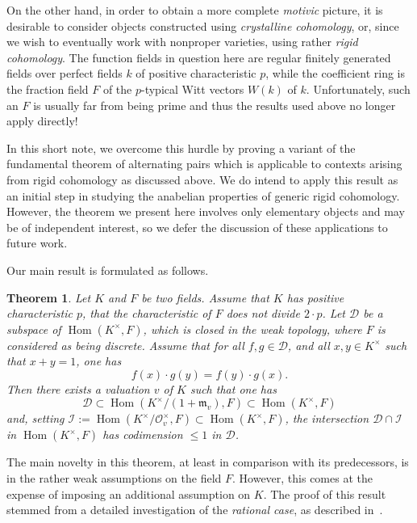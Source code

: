 \documentclass[12pt]{amsart}
\newcommand{\Hom}{\operatorname{Hom}}
\newcommand{\Dcal}{\mathcal{D}}
\newcommand{\Ical}{\mathcal{I}}
\newcommand{\mfrak}{\mathfrak{m}}
\newcommand{\Ocal}{\mathcal{O}}
\newtheorem{maintheorem}{Theorem}
\begin{document}
On the other hand, in order to obtain a more complete \emph{motivic} picture, it is desirable to consider objects constructed using \emph{crystalline cohomology}, or, since we wish to eventually work with nonproper varieties, using rather \emph{rigid cohomology}.
The function fields in question here are regular finitely generated fields over perfect fields $k$ of positive characteristic $p$, while the coefficient ring is the fraction field $F$ of the $p$-typical Witt vectors $W(k)$ of $k$.
Unfortunately, such an $F$ is usually far from being prime and thus the results used above no longer apply directly!

In this short note, we overcome this hurdle by proving a variant of the fundamental theorem of alternating pairs which is applicable to contexts arising from rigid cohomology as discussed above.
We do intend to apply this result as an initial step in studying the anabelian properties of generic rigid cohomology.
However, the theorem we present here involves only elementary objects and may be of independent interest, so we defer the discussion of these applications to future work.

Our main result is formulated as follows.

\begin{maintheorem}\label{maintheorem}
  Let $K$ and $F$ be two fields.
  Assume that $K$ has positive characteristic $p$, that the characteristic of $F$ does not divide $2 \cdot p$.
  Let $\Dcal$ be a subspace of $\Hom(K^{\times},F)$, which is closed in the weak topology, where $F$ is considered as being discrete.
  Assume that for all $f,g \in \Dcal$, and all $x,y \in K^{\times}$ such that $x + y = 1$, one has
  \[ f(x) \cdot g(y) = f(y) \cdot g(x). \]
  Then there exists a valuation $v$ of $K$ such that one has
  \[ \Dcal \subset \Hom(K^{\times}/(1+\mfrak_{v}),F) \subset \Hom(K^{\times},F) \]
  and, setting $\Ical := \Hom(K^{\times}/\Ocal_{v}^{\times},F) \subset \Hom(K^{\times},F)$, the intersection $\Dcal \cap \Ical$ in $\Hom(K^{\times},F)$ has codimension $\le 1$ in $\Dcal$.
\end{maintheorem}

The main novelty in this theorem, at least in comparison with its predecessors, is in the rather weak assumptions on the field $F$.
However, this comes at the expense of imposing an additional assumption on $K$.
The proof of this result stemmed from a detailed investigation of the \emph{rational case}, as described in~\cite[\S A]{https://doi.org/10.48550/arxiv.1705.01084}.
\end{document}

